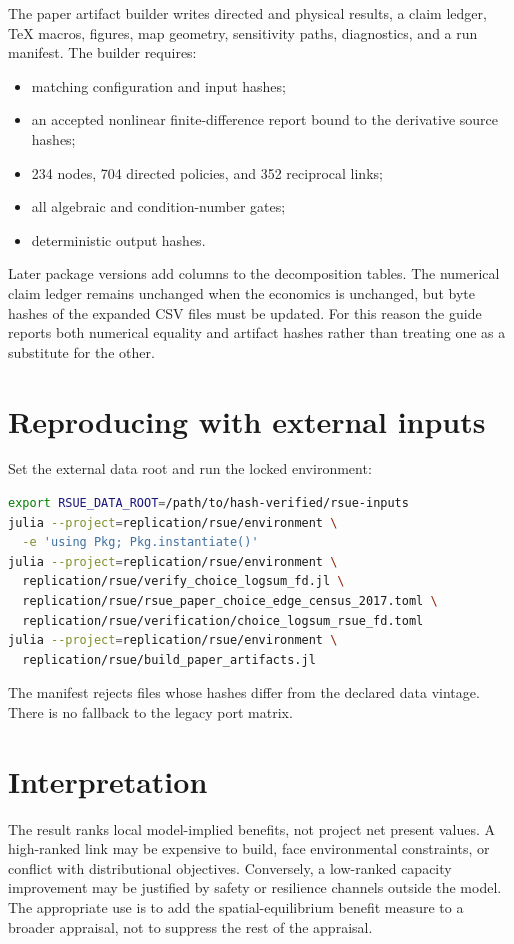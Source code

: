 The paper artifact builder writes directed and physical results, a claim
ledger, TeX macros, figures, map geometry, sensitivity paths, diagnostics, and
a run manifest. The builder requires:
\begin{itemize}
  \item matching configuration and input hashes;
  \item an accepted nonlinear finite-difference report bound to the derivative
  source hashes;
  \item 234 nodes, 704 directed policies, and 352 reciprocal links;
  \item all algebraic and condition-number gates;
  \item deterministic output hashes.
\end{itemize}

Later package versions add columns to the decomposition tables. The numerical
claim ledger remains unchanged when the economics is unchanged, but byte
hashes of the expanded CSV files must be updated. For this reason the guide
reports both numerical equality and artifact hashes rather than treating one
as a substitute for the other.

\section{Reproducing with external inputs}

Set the external data root and run the locked environment:
\begin{lstlisting}[language=bash]
export RSUE_DATA_ROOT=/path/to/hash-verified/rsue-inputs
julia --project=replication/rsue/environment \
  -e 'using Pkg; Pkg.instantiate()'
julia --project=replication/rsue/environment \
  replication/rsue/verify_choice_logsum_fd.jl \
  replication/rsue/rsue_paper_choice_edge_census_2017.toml \
  replication/rsue/verification/choice_logsum_rsue_fd.toml
julia --project=replication/rsue/environment \
  replication/rsue/build_paper_artifacts.jl
\end{lstlisting}
The manifest rejects files whose hashes differ from the declared data vintage.
There is no fallback to the legacy port matrix.

\section{Interpretation}

The result ranks local model-implied benefits, not project net present values.
A high-ranked link may be expensive to build, face environmental constraints,
or conflict with distributional objectives. Conversely, a low-ranked capacity
improvement may be justified by safety or resilience channels outside the
model. The appropriate use is to add the spatial-equilibrium benefit measure
to a broader appraisal, not to suppress the rest of the appraisal.

